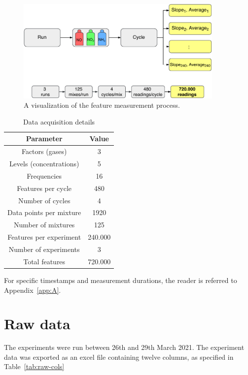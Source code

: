 \begin{figure}[h]
	\centering
	\includegraphics[width=0.9\textwidth]{../figures/features.pdf}
	\caption{A visualization of the feature measurement process.}
	\label{fig:features}
\end{figure}


\begin{table}[!ht]
	\centering
	\caption{Data acquisition details}
	\label{tab:measurements}
	\begin{tabular}{|c|c|}
		\hline
		\textbf{Parameter} & \textbf{Value} \\
		\hline
		Factors (gases) & 3 \\
		\hline
		Levels (concentrations) & 5 \\
		\hline
		Frequencies & 16 \\
		\hline
		Features per cycle & 480 \\
		\hline
		Number of cycles & 4 \\
		\hline
		Data points per mixture & 1920\\
		\hline
		Number of mixtures & 125 \\
		\hline
		Features per experiment & 240.000 \\
		\hline
		Number of experiments & 3 \\
		\hline
		Total features & 720.000 \\
		\hline
	\end{tabular}
\end{table}

For specific timestamps and measurement durations, the reader is referred to Appendix~\ref{app:A}.

\section{Raw data}
\label{sec:raw-data}

The experiments were run between 26th and 29th March 2021. The experiment data was exported as an excel file containing twelve columns, as specified in Table~\ref{tab:raw-cols}


